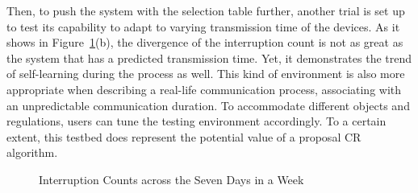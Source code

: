 Then, to push the system with the selection table further, another trial is set up to test its capability to adapt to varying transmission time of the devices. As it shows in Figure~\ref{fig:interruption_in_a_week}(b), the divergence of the interruption count is not as great as the system that has a predicted transmission time. Yet, it demonstrates the trend of self-learning during the process as well. This kind of environment is also more appropriate when describing a real-life communication process, associating with an unpredictable communication duration. To accommodate different objects and regulations, users can tune the testing environment accordingly. To a certain extent, this testbed does represent the potential value of a proposal CR algorithm.

\begin{figure}[ht]
 \hfill 	
\caption{Interruption Counts across the Seven Days in a Week}
\label{fig:interruption_in_a_week}
\end{figure}



